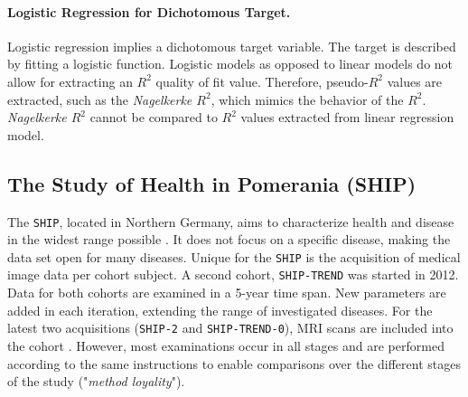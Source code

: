 \documentclass[journal]{style/vgtc} 			          %
\newcommand{\com}[1]{\textcolor{orange}{\uline{#1}}}
\begin{document}
\paragraph{Logistic Regression for Dichotomous Target.} Logistic regression implies a dichotomous target variable.
The target is described by fitting a logistic function.
Logistic models as opposed to linear models do not allow for extracting an $R^2$ quality of fit value.
Therefore, pseudo-$R^2$ values are extracted, such as the \emph{Nagelkerke $R^2$}, which mimics the behavior of the $R^2$.
\emph{Nagelkerke $R^2$} cannot be compared to $R^2$ values extracted from linear regression model.


\subsection{The Study of Health in Pomerania (SHIP)}
The \texttt{SHIP}, located in Northern Germany, aims to characterize health and disease in the widest range possible \cite{Volzke2011}.
It does not focus on a specific disease, making the data set open for many diseases.
Unique for the \texttt{SHIP} is the acquisition of medical image data per cohort subject.
A second cohort, \texttt{SHIP-TREND} was started in 2012.
Data for both cohorts are examined in a 5-year time span.
New parameters are added in each iteration, extending the range of investigated diseases.
For the latest two acquisitions (\texttt{SHIP-2} and \texttt{SHIP-TREND-0}), MRI scans are included into the cohort \cite{Hegenscheid2009, Ivanovska2014}.
However, most examinations occur in all stages and are performed according to the same instructions to enable comparisons over the different stages of the study ("\emph{method loyality}").
%
%
%
%
%
%
\end{document}
